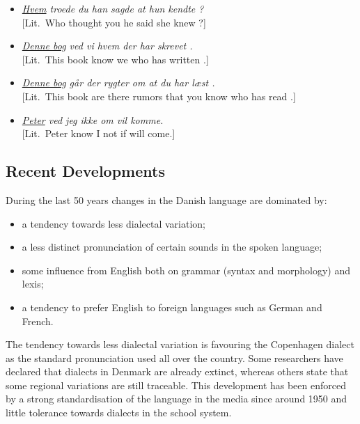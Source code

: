 \documentclass[]{../../metanetpaper}
\begin{document}
\begin{multicols}{2}
\begin{itemize}    
\item {\it \underline{Hvem} troede du han sagde at hun kendte \underline{\hspace{2mm}}?}\\
{[}Lit.\ Who thought you he said she knew \underline{\hspace{2mm}}?{]}
\item {\it \underline{Denne bog} ved vi hvem der har skrevet \underline{\hspace{2mm}}.}\\
{[}Lit.\ This book know we who has written \underline{\hspace{2mm}}.{]}
\item {\it \underline{Denne bog} g\aa r der rygter om at du har l\ae st \underline{\hspace{2mm}}.}\\
{[}Lit.\ This book are there rumors that you know who has read \underline{\hspace{2mm}}.{]}
\item {\it \underline{Peter} ved jeg ikke om \underline{\hspace{2mm}} vil komme.}\\
{[}Lit.\  Peter know I not if \underline{\hspace{2mm}} will come.{]}
\end{itemize}
 

\subsection{Recent Developments}

During the last 50 years changes in the Danish language are dominated by: 
\begin{itemize}
\item	a tendency towards less dialectal variation;
\item	a less distinct pronunciation of certain sounds in the spoken language;
\item	some influence from English both on grammar (syntax and morphology) and lexis; 
\item	a tendency to prefer English to foreign languages such as German and French. 
\end{itemize}
The tendency towards less dialectal variation is favouring the Copenhagen dialect as the standard pronunciation used all over the country. Some researchers have declared that dialects in Denmark are already extinct, whereas others state that some regional variations are still traceable. This development has been enforced by a strong standardisation of the language in the media since around 1950 and little tolerance towards dialects in the school system. 


\end{multicols}
\end{document}
